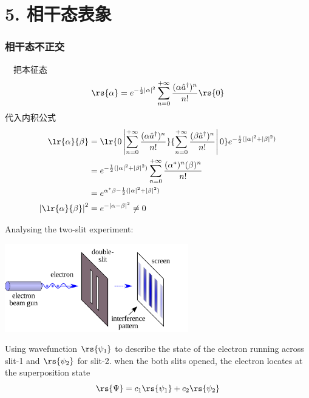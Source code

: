 \section{5. 相干态表象}

\begin{frame}
    \frametitle{相干态不正交}
        \例[11.试证明相干态不具正交性]{}
        \证 ~ 把本征态
        \[\rs{\alpha}=e^{-\frac{1}{2}\left|\alpha\right|^2}  \sum_{n=0} ^{+\infty}  \frac{(\alpha\hat{a}^\dagger)^n}{n!}\rs{0} \] 
    代入内积公式
    \[ \begin{aligned}
     \lr{\alpha}{\beta} &= \lr{0\left|\sum_{n=0} ^{+\infty}\frac{(\alpha\hat{a}^\dagger)^n}{n!}}{\sum_{n=0} ^{+\infty}\frac{(\beta\hat{a}^\dagger)^n}{n!}\right|0} e^{-\frac{1}{2}(\left|\alpha\right|^2 +\left|\beta\right|^2)}\\ 
     &= e^{-\frac{1}{2}(\left|\alpha\right|^2 +\left|\beta\right|^2)} \sum_{n=0} ^{+\infty}\frac{(\alpha^*)^n (\beta)^n}{n!} \\ 
     &= e^{\alpha^* \beta -\frac{1}{2}(\left|\alpha\right|^2 +\left|\beta\right|^2)} \\ 
     \left|\lr{\alpha}{\beta} \right|^2 &= e^{-  \left| \alpha - \beta\right|^2} \not = 0 
    \end{aligned}\]
\end{frame}

\begin{frame}
    Analysing the two-slit experiment:
      \begin{center}
           \includegraphics[width=0.6\textwidth]{figs/Etwoslitexp.png}
      \end{center}
    \begin{itemize}
        \Item Using wavefunction $\rs{\psi_1}$ to describe the state of the electron running across slit-1 and $\rs{\psi_2}$ for slit-2. when the both slits opened, the electron locates at the superposition state
            \[ \rs{\Psi}=c_1 \rs{\psi_1}+ c_2\rs{\psi_2} \]
    \end{itemize}
\end{frame}

